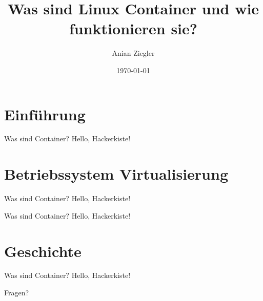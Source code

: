 \documentclass{beamer}
\title{Was sind Linux Container und wie funktionieren sie?}
\date{\today}
\author{Anian Ziegler}
\institute{cioplenu}
\begin{document}
  \maketitle
  \section{Einführung}
  \begin{frame}{Was sind Container?}
    Hello, Hackerkiste!
  \end{frame}

  \section{Betriebssystem Virtualisierung}
  \begin{frame}{Was sind Container?}
    Hello, Hackerkiste!
  \end{frame}
  \begin{frame}{Was sind Container?}
    Hello, Hackerkiste!
  \end{frame}
  \section{Geschichte}
  \begin{frame}{Was sind Container?}
    Hello, Hackerkiste!
  \end{frame}
  \begin{frame}[standout]
    Fragen?
  \end{frame}
\end{document}

